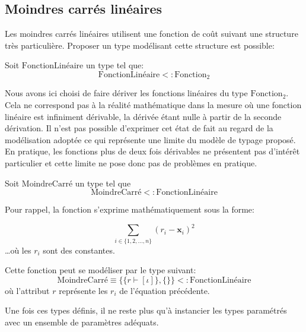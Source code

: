 \subsection{Moindres carrés linéaires}
\label{sec:chap1_model2impl_typage_ex_moindre}

Les moindres carrés linéaires
utilisent une fonction de coût suivant une structure très
particulière. Proposer un type modélisant cette structure est
possible:

\begin{mydef}\label{ex:chap1_linearfct}
  Soit $\text{FonctionLinéaire}$ un type tel que:
  $$\text{FonctionLinéaire} <: \text{Fonction}_2$$
\end{mydef}

Nous avons ici choisi de faire dériver les fonctions
linéaires du type $\text{Fonction}_2$. Cela
ne correspond pas à la réalité mathématique dans la mesure où une
fonction linéaire est infiniment dérivable, la dérivée étant nulle à
partir de la seconde dérivation. Il n'est pas possible d'exprimer cet
état de fait au regard de la modélisation adoptée ce qui représente
une limite du modèle de typage proposé. En pratique, les fonctions
plus de deux fois dérivables ne présentent pas d'intérêt particulier
et cette limite ne pose donc pas de problèmes en pratique.

\begin{mydef}\label{ex:chap1_leastsquarefct}
  Soit $\text{MoindreCarré}$ un type tel que
  $$\text{MoindreCarré} <: \text{FonctionLinéaire}$$

  Pour rappel, la fonction s'exprime mathématiquement sous la forme:

  \begin{equation}
    \sum_{i \in \{1, 2, \dotsc, n\}} (r_i - \mathbf{x}_i)^2
  \end{equation}
  \ldots où les $r_i$ sont des constantes.

  Cette fonction peut se modéliser par le type suivant:
  \begin{equation}
    \text{MoindreCarré} \equiv \{ \{ r \vdash [\iota] \}, \{ \} \} <: \text{FonctionLinéaire}
  \end{equation}
  où l'attribut $r$ représente les $r_i$ de l'équation précédente.
\end{mydef}


Une fois ces types définis, il ne reste plus qu'à instancier les types
paramétrés avec un ensemble de paramètres adéquats.

